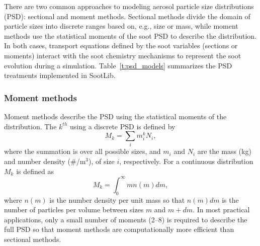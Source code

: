 \documentclass[preprint,letterpaper]{elsarticle}
\begin{document}
There are two common approaches to modeling aerosol particle size distributions (PSD): sectional and moment methods. Sectional methods divide the domain of particle sizes into discrete ranges based on, e.g., size or mass, while moment methods use the statistical moments of the soot PSD to describe the distribution. In both cases, transport equations defined by the soot variables (sections or moments) interact with the soot chemistry mechanisms to represent the soot evolution during a simulation. Table~\ref{t:psd_models} summarizes the PSD treatments implemented in SootLib.
%
\begin{table}
    \caption{Summary of soot particle size distribution models implemented in SootLib.}
    \label{t:psd_models}
    \centering
\end{table}
%


\subsubsection{Moment methods}
\label{s:moment-methods}

Moment methods describe the PSD using the statistical moments of the distribution. The $k^{th}$ using a discrete PSD is defined by
%
\begin{equation}
    M_k = \sum_i m_i^kN_i,
\end{equation}
%
where the summation is over all possible sizes, and $m_i$ and $N_i$ are the mass (kg) and number density (\#/m$^3$), of size $i$, respectively. For a continuous distribution $M_k$ is defined as
%
\begin{equation} \label{e:mk}
    M_k = \int_0^\infty mn(m)dm,
\end{equation}
%
where $n(m)$ is the number density per unit mass so that $n(m)dm$ is the number of particles per volume between sizes $m$ and $m+dm$.
In most practical applications, only a small number of moments (2--8) is required to describe the full PSD so that moment methods are computationally more efficient than sectional methods. 
\end{document}
